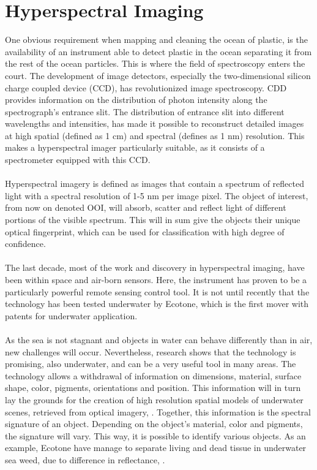 \section{Hyperspectral Imaging}
One obvious requirement when mapping and cleaning the ocean of plastic, is the availability of an instrument able to detect plastic in the ocean separating it from the rest of the ocean particles. This is where the field of spectroscopy enters the court. The development of image detectors, especially the two-dimensional silicon charge coupled device (CCD), has revolutionized image spectroscopy. CDD provides information on the distribution of photon intensity along the spectrograph's entrance slit. The distribution of entrance slit into different wavelengths and intensities, has made it possible to reconstruct detailed images at high spatial (defined as 1 cm) and spectral (defines as 1 nm) resolution. This makes a hyperspectral imager particularly suitable, as it consists of a spectrometer equipped with this CCD. 
\\\\
Hyperspectral imagery is defined as images that contain a spectrum of reflected light with a spectral resolution of 1-5 nm per image pixel. The object of interest, from now on denoted OOI, will absorb, scatter and reflect light of different portions of the visible spectrum. This will in sum give the objects their unique optical fingerprint, which can be used for classification with high degree of confidence. \cite{odegard_johnsen_sorensen_2014}
\\\\
The last decade, most of the work and discovery in hyperspectral imaging, have been within space and air-born sensors. Here, the instrument has proven to be a particularly powerful remote sensing control tool. It is not until recently that the technology has been tested underwater by Ecotone, which is the first mover with patents for underwater application. \cite{sorensen2018}
\\\\
As the sea is not stagnant and objects in water can behave differently than in air, new challenges will occur. Nevertheless, research shows that the technology is promising, also underwater, and can be a very useful tool in many areas. The technology allows a withdrawal of information on dimensions, material, surface shape, color, pigments, orientations and position. This information will in turn lay the grounds for the creation of high resolution spatial models of underwater scenes, retrieved from optical imagery, \cite{sorensen2018}. Together, this information is the spectral signature of an object. Depending on the object's material, color and pigments, the signature will vary. This way, it is possible to identify various objects. As an example, Ecotone have manage to separate living and dead tissue in underwater sea weed, due to difference in reflectance, \cite{sorensen2018}.
